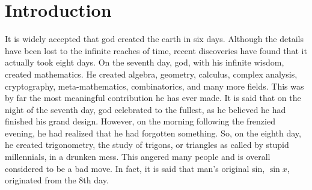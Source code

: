 \section{Introduction}

It is widely accepted that god created the earth in six days.
Although the details have been lost to the infinite reaches of time, recent discoveries have found that it actually took eight days.
On the seventh day, god, with his infinite wisdom, created mathematics.
He created algebra, geometry, calculus, complex analysis, cryptography, meta-mathematics, combinatorics, and many more fields.
This was by far the most meaningful contribution he has ever made.
It is said that on the night of the seventh day, god celebrated to the fullest, as he believed he had finished his grand design.
However, on the morning following the frenzied evening, he had realized that he had forgotten something.
So, on the eighth day, he created trigonometry, the study of trigons, or triangles as called by stupid millennials, in a drunken mess.
This angered many people and is overall considered to be a bad move.
In fact, it is said that man’s original sin, $\sin x$, originated from the 8th day.
